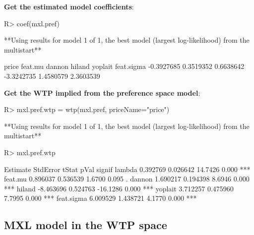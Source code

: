\documentclass[article]{jss}
\begin{document}
\textbf{Get the estimated model coefficients}:

\begin{CodeChunk}

\begin{CodeInput}
R> coef(mxl.pref)
\end{CodeInput}

\begin{CodeOutput}
**Using results for model 1 of 1,
the best model (largest log-likelihood) from the multistart**
\end{CodeOutput}

\begin{CodeOutput}
     price    feat.mu     dannon     hiland    yoplait feat.sigma 
-0.3927685  0.3519352  0.6638642 -3.3242735  1.4580579  2.3603539 
\end{CodeOutput}
\end{CodeChunk}

\textbf{Get the WTP implied from the preference space model}:

\begin{CodeChunk}

\begin{CodeInput}
R> mxl.pref.wtp = wtp(mxl.pref, priceName="price")
\end{CodeInput}

\begin{CodeOutput}
**Using results for model 1 of 1,
the best model (largest log-likelihood) from the multistart**
\end{CodeOutput}

\begin{CodeInput}
R> mxl.pref.wtp
\end{CodeInput}

\begin{CodeOutput}
            Estimate StdError    tStat  pVal signif
lambda      0.392769 0.026642  14.7426 0.000    ***
feat.mu     0.896037 0.536539   1.6700 0.095      .
dannon      1.690217 0.194398   8.6946 0.000    ***
hiland     -8.463696 0.524763 -16.1286 0.000    ***
yoplait     3.712257 0.475960   7.7995 0.000    ***
feat.sigma  6.009529 1.438721   4.1770 0.000    ***
\end{CodeOutput}
\end{CodeChunk}

\newpage

\hypertarget{mxl-model-in-the-wtp-space}{%
\subsection{MXL model in the WTP
space}\label{mxl-model-in-the-wtp-space}}
\end{document}
